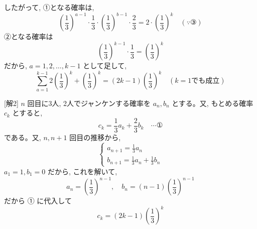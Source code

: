 \documentclass[../main.tex]{subfiles}
\begin{document}
したがって, ①となる確率は,
\[
  \left(\frac{1}{3}\right)^{a-1} \cdot \frac{1}{3} \cdot \left(\frac{1}{3}\right)^{b-1} \cdot \frac{2}{3} = 2 \cdot \left(\frac{1}{3}\right)^k \quad (\because \text{③})
\]
②となる確率は
\[
  \left(\frac{1}{3}\right)^{k-1} \cdot \frac{1}{3} = \left(\frac{1}{3}\right)^k
\]
だから, $a = 1, 2, \dots, k-1$ として足して,
\[
  \sum_{a=1}^{k-1} 2\left(\frac{1}{3}\right)^k + \left(\frac{1}{3}\right)^k = (2k-1)\left(\frac{1}{3}\right)^k \quad (k=1 \text{でも成立})
\]

\medskip

[解2] $n$ 回目に3人, 2人でジャンケンする確率を $a_n, b_n$ とする。又, もとめる確率 $c_k$ とすると,
\[
  c_k = \frac{1}{3} a_k + \frac{2}{3} b_k \quad \cdots \text{①}
\]
である。又, $n, n+1$ 回目の推移から,
\[
  \begin{cases}
    a_{n+1} = \frac{1}{3} a_n \\
    b_{n+1} = \frac{1}{3} a_n + \frac{1}{3} b_n
  \end{cases}
\]
$a_1 = 1, b_1 = 0$ だから, これを解いて,
\[
  a_n = \left(\frac{1}{3}\right)^{n-1}, \quad b_n = (n-1)\left(\frac{1}{3}\right)^{n-1}
\]
だから ① に代入して
\[
  c_k = (2k-1)\left(\frac{1}{3}\right)^k
\]
\end{document}
